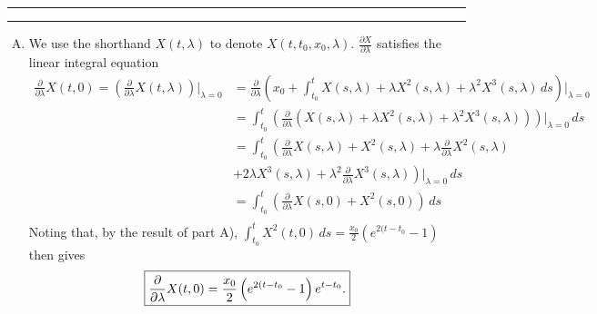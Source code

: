 \documentclass[11pt]{article}
\newcounter{questionCounter}
\newcounter{partCounter}[questionCounter]
\newenvironment{question}[2][\arabic{questionCounter}]{%
    \setcounter{partCounter}{0}%
    \vspace{.25in} \hrule \vspace{0.5em}%
        \noindent{\bf #2}%
    \vspace{0.8em} \hrule \vspace{.10in}%
    \addtocounter{questionCounter}{1}%
}{}
\begin{document}
\begin{question}{Problem 2}
\begin{enumerate}[A)]
\item We use the shorthand $X(t,\lambda)$ to denote $X(t,t_0,x_0,\lambda)$.
$\frac{\partial X}{\partial \lambda}$ satisfies the linear integral equation
\begin{align*}
\frac{\partial}{\partial \lambda} X(t,0)
 = \left( \frac{\partial}{\partial \lambda} X(t,\lambda) \right)
                                                        \bigg|_{\lambda = 0}
 & = \frac{\partial}{\partial \lambda}
        \left( x_0 + \int_{t_0}^t X(s,\lambda)
                        + \lambda X^2(s,\lambda)
                        + \lambda^2 X^3(s,\lambda) \, ds \right)
                                                        \bigg|_{\lambda = 0} \\
 & = \int_{t_0}^t \left( \frac{\partial}{\partial \lambda}
                  \left( X(s,\lambda)
                  + \lambda X^2(s,\lambda)
                  + \lambda^2 X^3(s,\lambda) \right) \right)
                                          \bigg|_{\lambda = 0} \, ds \\
 & = \int_{t_0}^t \left( \frac{\partial}{\partial \lambda} X(s,\lambda)
          + X^2(s,\lambda)
          + \lambda \frac{\partial}{\partial \lambda} X^2(s,\lambda) \right.\\
 & + \left. 2\lambda X^3(s,\lambda) 
          + \lambda^2 \frac{\partial}{\partial \lambda} X^3(s,\lambda)
                                  \right) \bigg|_{\lambda = 0} \, ds \\
 & = \int_{t_0}^t \left( \frac{\partial}{\partial \lambda}
                        X(s,0) + X^2(s,0) \right) \, ds \\
\end{align*}
Noting that, by the result of part A),
$\int_{t_0}^t X^2(t,0) \, ds = \frac{x_0}{2}\left( e^{2(t - t_0} - 1 \right)$
then gives
\[
\mbox{\fbox{$\displaystyle \frac{\partial}{\partial \lambda} X(t,0)
 = \frac{x_0}{2}\left( e^{2(t - t_0} - 1 \right) e^{t - t_0}$.}}
\]
\end{enumerate}
\end{question}
\end{document}
